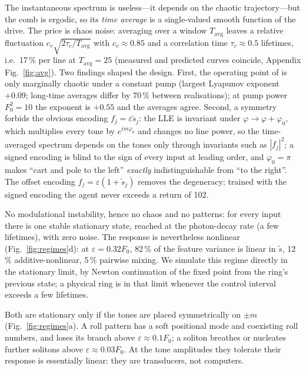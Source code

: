 \documentclass[10pt,a4paper]{article}
\newcommand{\ts}{\tilde s}
\newcommand{\Tavg}{T_{\mathrm{avg}}}
\newcommand{\Fz}{F_0}
\begin{document}
\begin{description}[style=unboxed,leftmargin=0pt,itemsep=2pt]
\item[Chaotic comb (anomalous dispersion, pump well above threshold).]  The instantaneous spectrum is useless---it
depends on the chaotic trajectory---but the comb is ergodic, so its \emph{time average} is a single-valued smooth function of
the drive.  The price is chaos noise: averaging over a window $\Tavg$ leaves a relative fluctuation $c_v\sqrt{2\tau_c/\Tavg}$
with $c_v\approx0.85$ and a correlation time $\tau_c\approx0.5$ lifetimes, i.e.\ 17\,\% per line at $\Tavg=25$ (measured and
predicted curves coincide, Appendix Fig.~\ref{fig:avg}).  Two findings shaped the design.  First, the operating point of
\cite{ref:prr_2025} is only marginally chaotic under a constant pump (largest Lyapunov exponent $+0.09$; long-time averages differ by
70\,\% between realisations); at pump power $\Fz^2=10$ the exponent is $+0.55$ and the averages agree.  Second, a symmetry
forbids the obvious encoding $f_j=\varepsilon\ts_j$: the LLE is invariant under $\varphi\to\varphi+\varphi_0$, which
multiplies every tone by $e^{im\varphi_0}$ and changes no line power, so the time-averaged spectrum depends on the tones only
through invariants such as $|f_j|^2$; a signed encoding is blind to the sign of every input at leading order, and
$\varphi_0=\pi$ makes ``cart and pole to the left'' \emph{exactly} indistinguishable from ``to the right''.  The offset
encoding $f_j=\varepsilon(1+\ts_j)$ removes the degeneracy; trained with the signed encoding the agent never exceeds a
return of 102.
\item[Ring without pattern formation (normal dispersion, monostable detuning).]  No modulational instability, hence no
chaos and no patterns: for every input there is one stable stationary state, reached at the photon-decay rate
(a few lifetimes), with zero noise.  The response is nevertheless nonlinear (Fig.~\ref{fig:regimes}d): at
$\varepsilon=0.32\Fz$, 82\,\% of the feature variance is linear in $\ts$, 12\,\% additive-nonlinear, 5\,\% pairwise mixing.
We simulate this regime directly in the stationary limit, by Newton continuation of the fixed point from the ring's previous
state; a physical ring is in that limit whenever the control interval exceeds a few lifetimes.
\item[Turing rolls and single solitons.]  Both are stationary only if the tones are placed symmetrically on $\pm m$
(Fig.~\ref{fig:regimes}a).  A roll pattern has a soft positional mode and coexisting roll numbers, and loses its branch
above $\varepsilon\approx0.1\Fz$; a soliton breathes or nucleates further solitons above $\varepsilon\approx0.03\Fz$.
At the tone amplitudes they tolerate their response is essentially linear: they are transducers, not computers.
\end{description}
\end{document}

